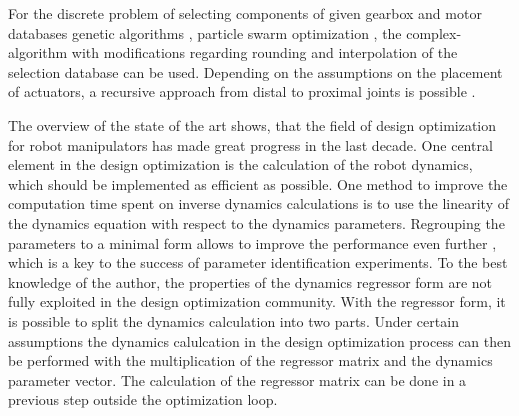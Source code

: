 \documentclass{svproc}
\begin{document}
For the discrete problem of selecting components of given gearbox and motor databases genetic algorithms \cite{TarkianPerOelFen2011,Padilla-GarciaCruRod2015}, particle swarm optimization \cite{RamirezKotOrt2017}, the complex-algorithm with modifications regarding rounding and interpolation of the selection database \cite{PetterssonAndKru2005,ZhouBaiHan2011} can be used.
Depending on the assumptions on the placement of actuators, a recursive approach from distal to proximal joints is possible \cite{ChedmailGau1990}.




The overview of the state of the art shows, that the field of design optimization for robot manipulators has made great progress in the last decade.
One central element in the design optimization is the calculation of the robot dynamics, which should be implemented as efficient as possible.
One method to improve the computation time spent on inverse dynamics calculations is to use the linearity of the dynamics equation with respect to the dynamics parameters.
Regrouping the parameters to a minimal form allows to improve the performance even further \cite{KhalilDom2002}, which is a key to the success of parameter identification experiments.
To the best knowledge of the author, the properties of the dynamics regressor form are not fully exploited in the design optimization community.
With the regressor form, it is possible to split the dynamics calculation into two parts.
Under certain assumptions the dynamics calulcation in the design optimization process can then be performed with the multiplication of the regressor matrix and the dynamics parameter vector.
The calculation of the regressor matrix can be done in a previous step outside the optimization loop.
\end{document}
